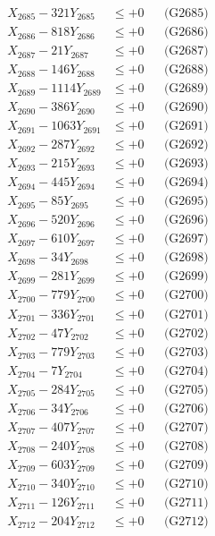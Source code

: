 \documentclass[a4paper,10pt]{article}
\begin{document}
{\begin{align}
X_{2685} - 321Y_{2685} &\leq +0 && \text{(G2685)} \\
X_{2686} - 818Y_{2686} &\leq +0 && \text{(G2686)} \\
X_{2687} - 21Y_{2687} &\leq +0 && \text{(G2687)} \\
X_{2688} - 146Y_{2688} &\leq +0 && \text{(G2688)} \\
X_{2689} - 1114Y_{2689} &\leq +0 && \text{(G2689)} \\
X_{2690} - 386Y_{2690} &\leq +0 && \text{(G2690)} \\
\allowbreak
X_{2691} - 1063Y_{2691} &\leq +0 && \text{(G2691)} \\
X_{2692} - 287Y_{2692} &\leq +0 && \text{(G2692)} \\
X_{2693} - 215Y_{2693} &\leq +0 && \text{(G2693)} \\
X_{2694} - 445Y_{2694} &\leq +0 && \text{(G2694)} \\
X_{2695} - 85Y_{2695} &\leq +0 && \text{(G2695)} \\
X_{2696} - 520Y_{2696} &\leq +0 && \text{(G2696)} \\
X_{2697} - 610Y_{2697} &\leq +0 && \text{(G2697)} \\
X_{2698} - 34Y_{2698} &\leq +0 && \text{(G2698)} \\
X_{2699} - 281Y_{2699} &\leq +0 && \text{(G2699)} \\
X_{2700} - 779Y_{2700} &\leq +0 && \text{(G2700)} \\
\allowbreak
X_{2701} - 336Y_{2701} &\leq +0 && \text{(G2701)} \\
X_{2702} - 47Y_{2702} &\leq +0 && \text{(G2702)} \\
X_{2703} - 779Y_{2703} &\leq +0 && \text{(G2703)} \\
X_{2704} - 7Y_{2704} &\leq +0 && \text{(G2704)} \\
X_{2705} - 284Y_{2705} &\leq +0 && \text{(G2705)} \\
X_{2706} - 34Y_{2706} &\leq +0 && \text{(G2706)} \\
X_{2707} - 407Y_{2707} &\leq +0 && \text{(G2707)} \\
X_{2708} - 240Y_{2708} &\leq +0 && \text{(G2708)} \\
X_{2709} - 603Y_{2709} &\leq +0 && \text{(G2709)} \\
X_{2710} - 340Y_{2710} &\leq +0 && \text{(G2710)} \\
\allowbreak
X_{2711} - 126Y_{2711} &\leq +0 && \text{(G2711)} \\
X_{2712} - 204Y_{2712} &\leq +0 && \text{(G2712)} \\

\end{align}}
\end{document}
